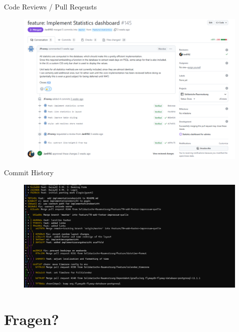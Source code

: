 \documentclass{sdqbeamer}
\begin{document}
    
    \begin{frame}{Code Reviews / Pull Reqeusts}
        \thispagestyle{plain}
    \begin{figure}
        \centering
        \includegraphics[width=1\linewidth]{pr_reviews.png}
        \label{fig:enter-label}
    \end{figure}
    \end{frame}
    
    \begin{frame}{Commit History}
        \thispagestyle{plain}
        \begin{figure}
            \centering
            \includegraphics[width=1\linewidth]{image.png}
            \label{fig:enter-label}
        \end{figure}
    \end{frame}
    
    
    \section{Fragen?}
    
    
\end{document}
